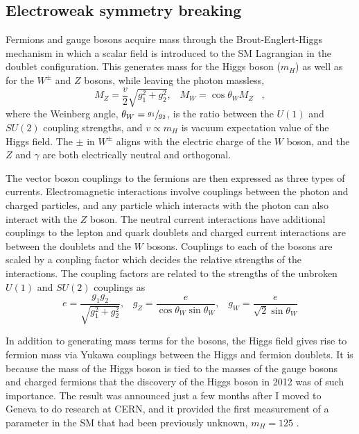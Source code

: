 \subsection{Electroweak symmetry breaking}
 \label{sec:higgsmech}
 Fermions and gauge bosons
  acquire mass through the Brout-Englert-Higgs
  mechanism
  in which a  scalar field %
  is introduced to the SM Lagrangian in the 
  doublet configuration.
 This generates mass for the Higgs boson ($m_H$)
  as well as for the
  $W^\pm$ and $Z$ bosons, while leaving the photon massless,
\begin{equation}\label{eq:bosons}
 M_Z = \frac{v}{2}\sqrt{g_1^2 + g_2^2}, \;\;\; M_W = \cos\theta_W M_Z\;\;\;,
\end{equation}  
  where the Weinberg angle, $\theta_W=\sfrac{g_1}{g_2}$,
  is the ratio between the $U(1)$ and $SU(2)$ coupling strengths,
  and $v\propto m_H$ is vacuum expectation value of the 
  Higgs field.
 The $\pm$ in $W^\pm$ aligns with the electric charge of
  the $W$ boson, %
  and the $Z$ and $\gamma$ are both electrically neutral and orthogonal.

 The vector boson couplings to the fermions
  are then expressed as three types of currents.
 Electromagnetic interactions 
  involve couplings between the photon
  and charged particles,
  and any particle which interacts with the photon
  can also interact with the $Z$ boson. 
 The neutral current interactions have additional
  couplings to the lepton and quark doublets
  and charged current interactions
  are between the doublets and the $W$ bosons.
 Couplings to each of the bosons are scaled by
  a coupling factor which decides the relative
  strengths of the interactions.
 The coupling factors are related to the
  strengths of the unbroken
  $U(1)$ and $SU(2)$ couplings as
\begin{equation}
e   =  \frac{g_1 g_2}{\sqrt{g_1^2+g_2^2}},\;\;\;
g_Z =  \frac{e}{\cos \theta_W \sin \theta_W},\;\;\;
g_W =  \frac{e}{\sqrt{2} \sin \theta_W}
\end{equation}

 In addition to generating mass terms for the bosons,
  the Higgs field gives rise to fermion mass 
  via Yukawa couplings between the Higgs
  and fermion doublets.
 It is because the mass of the Higgs boson is tied
  to the masses of the gauge bosons and 
  charged fermions that the discovery of
  the Higgs boson in 2012
  was of such importance.
 The result was announced just a few months
  after I moved to Geneva
  to do research at CERN,
  and it provided the first measurement of
  a parameter in the SM that had been previously unknown,
  $m_H=125$ \GeV.

